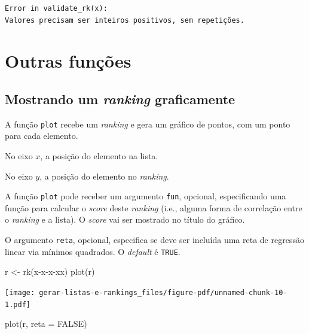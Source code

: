 \documentclass[
  letterpaper,
  DIV=11,
  numbers=noendperiod]{scrreprt}
\newenvironment{Shaded}{\begin{snugshade}}{\end{snugshade}}
\newcommand{\AttributeTok}[1]{\textcolor[rgb]{0.40,0.45,0.13}{#1}}
\newcommand{\ConstantTok}[1]{\textcolor[rgb]{0.56,0.35,0.01}{#1}}
\newcommand{\FunctionTok}[1]{\textcolor[rgb]{0.28,0.35,0.67}{#1}}
\newcommand{\NormalTok}[1]{\textcolor[rgb]{0.00,0.23,0.31}{#1}}
\newcommand{\OtherTok}[1]{\textcolor[rgb]{0.00,0.23,0.31}{#1}}
\newcommand{\StringTok}[1]{\textcolor[rgb]{0.13,0.47,0.30}{#1}}
\begin{document}
\begin{verbatim}
Error in validate_rk(x): 
Valores precisam ser inteiros positivos, sem repetições.
\end{verbatim}

\section{Outras funções}\label{outras-funuxe7uxf5es}

\subsection{\texorpdfstring{Mostrando um \emph{ranking}
graficamente}{Mostrando um ranking graficamente}}\label{mostrando-um-ranking-graficamente}

A função \texttt{plot} recebe um \emph{ranking} e gera um gráfico de
pontos, com um ponto para cada elemento.

No eixo $x$, a posição do elemento na lista.

No eixo $y$, a posição do elemento no \emph{ranking}.

A função \texttt{plot} pode receber um argumento \texttt{fun}, opcional,
especificando uma função para calcular o \emph{score} deste
\emph{ranking} (i.e., alguma forma de correlação entre o \emph{ranking}
e a lista). O \emph{score} vai ser mostrado no título do gráfico.

O argumento \texttt{reta}, opcional, especifica se deve ser incluída uma
reta de regressão linear via mínimos quadrados. O \emph{default} é
\texttt{TRUE}.

\begin{Shaded}
\begin{Highlighting}[]
\NormalTok{r }\OtherTok{\textless{}{-}} \FunctionTok{rk}\NormalTok{(}\StringTok{\textquotesingle{}x{-}x{-}x{-}xx\textquotesingle{}}\NormalTok{)}
\FunctionTok{plot}\NormalTok{(r)}
\end{Highlighting}
\end{Shaded}

\begin{center}
\texttt{[image: gerar-listas-e-rankings\_files/figure-pdf/unnamed-chunk-10-1.pdf]}
\end{center}

\begin{Shaded}
\begin{Highlighting}[]
\FunctionTok{plot}\NormalTok{(r, }\AttributeTok{reta =} \ConstantTok{FALSE}\NormalTok{)}
\end{Highlighting}
\end{Shaded}
\end{document}
